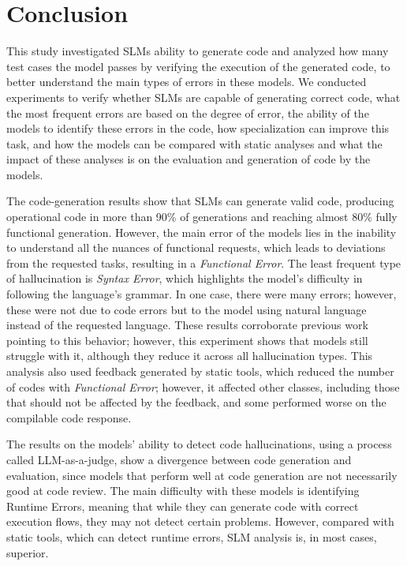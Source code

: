 \section{Conclusion}

This study investigated SLMs ability to generate code and analyzed how many test cases the model passes by verifying the execution of the generated code, to better understand the main types of errors in these models. We conducted experiments to verify whether SLMs are capable of generating correct code, what the most frequent errors are based on the degree of error, the ability of the models to identify these errors in the code, how specialization can improve this task, and how the models can be compared with static analyses and what the impact of these analyses is on the evaluation and generation of code by the models.

The code-generation results show that SLMs can generate valid code, producing operational code in more than 90\% of generations and reaching almost 80\% fully functional generation. However, the main error of the models lies in the inability to understand all the nuances of functional requests, which leads to deviations from the requested tasks, resulting in a \emph{Functional Error}. The least frequent type of hallucination is \emph{Syntax Error}, which highlights the model's difficulty in following the language's grammar. In one case, there were many errors; however, these were not due to code errors but to the model using natural language instead of the requested language. These results corroborate previous work pointing to this behavior; however, this experiment shows that models still struggle with it, although they reduce it across all hallucination types. This analysis also used feedback generated by static tools, which reduced the number of codes with \emph{Functional Error}; however, it affected other classes, including those that should not be affected by the feedback, and some performed worse on the compilable code response.

The results on the models' ability to detect code hallucinations, using a process called LLM-as-a-judge, show a divergence between code generation and evaluation, since models that perform well at code generation are not necessarily good at code review. The main difficulty with these models is identifying Runtime Errors, meaning that while they can generate code with correct execution flows, they may not detect certain problems. However, compared with static tools, which can detect runtime errors, SLM analysis is, in most cases, superior.

